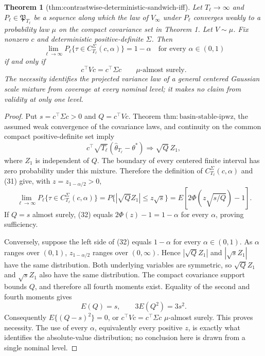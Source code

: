 \documentclass{article}
\newtheorem{theorem}{Theorem}
\begin{document}
\begin{theorem}[thm:contrastwise-deterministic-sandwich-iff]\label{thm:contrastwise-deterministic-sandwich-iff}
Let \(T_\ell\to\infty\) and \(P_\ell\in\mathfrak P_{T_\ell}\) be a sequence along which the law of \(V_\infty\) under \(P_\ell\) converges weakly to a probability law \(\mu\) on the compact covariance set in Theorem 1. Let \(V\sim\mu\). Fix nonzero \(c\) and deterministic positive-definite \(\Sigma\). Then
\[
 \lim_{\ell\to\infty}P_\ell\{\tau\in C_{T_\ell}^{\Sigma}(c,\alpha)\}=1-\alpha
 \quad\text{for every }\alpha\in(0,1)
\]
if and only if
\[
 c^\top Vc=c^\top\Sigma c\qquad\mu\text{-almost surely}.
\]
The necessity identifies the projected variance law of a general centered Gaussian scale mixture from coverage at every nominal level; it makes no claim from validity at only one level.
\end{theorem}
\begin{proof}
Put \(s=c^\top\Sigma c>0\) and \(Q=c^\top Vc\).  Theorem \(\mathrm{thm:basin\text{-}stable\text{-}ipwz}\), the assumed weak convergence of the covariance laws, and continuity on the common compact positive-definite set imply
\[
 c^\top\sqrt{T_\ell}(\widehat\theta_{T_\ell}-\theta^*)
 \Rightarrow \sqrt Q\,Z_1,                                                \tag{31}
\]
where \(Z_1\) is independent of \(Q\).  The boundary of every centered finite interval has zero probability under this mixture.  Therefore the definition of \(C_{T_\ell}^{\Sigma}(c,\alpha)\) and (31) give, with \(z=z_{1-\alpha/2}>0\),
\[
 \lim_{\ell\to\infty}P_\ell\{\tau\in C_{T_\ell}^{\Sigma}(c,\alpha)\}
 =P\{|\sqrt QZ_1|\le z\sqrt s\}
 =E\!\left[2\Phi\!\left(z\sqrt{s/Q}\right)-1\right].                 \tag{32}
\]
If \(Q=s\) almost surely, (32) equals \(2\Phi(z)-1=1-\alpha\) for every \(\alpha\), proving sufficiency.

Conversely, suppose the left side of (32) equals \(1-\alpha\) for every \(\alpha\in(0,1)\).  As \(\alpha\) ranges over \((0,1)\), \(z_{1-\alpha/2}\) ranges over \((0,\infty)\).  Hence \(|\sqrt QZ_1|\) and \(|\sqrt sZ_1|\) have the same distribution.  Both underlying variables are symmetric, so \(\sqrt QZ_1\) and \(\sqrt sZ_1\) also have the same distribution.  The compact covariance support bounds \(Q\), and therefore all fourth moments exist.  Equality of the second and fourth moments gives
\[
 E(Q)=s,
 \qquad
 3E(Q^2)=3s^2.
\]
Consequently \(E\{(Q-s)^2\}=0\), or \(c^\top Vc=c^\top\Sigma c\) \(\mu\)-almost surely.  This proves necessity.  The use of every \(\alpha\), equivalently every positive \(z\), is exactly what identifies the absolute-value distribution; no conclusion here is drawn from a single nominal level.
\end{proof}
\end{document}
